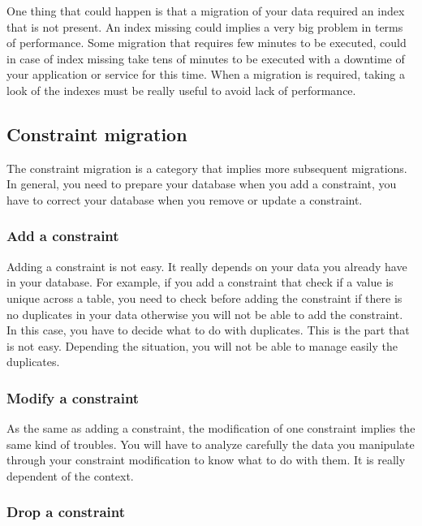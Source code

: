 One thing that could happen is that a migration of your data required an index that is not present. An index missing could implies a very big problem in terms of performance. Some migration that requires few minutes to be executed, could in case of index missing take tens of minutes to be executed with a downtime of your application or service for this time. When a migration is required, taking a look of the indexes must be really useful to avoid lack of performance.

\subsection{Constraint migration}

The constraint migration is a category that implies more subsequent migrations. In general, you need to prepare your database when you add a constraint, you have to correct your database when you remove or update a constraint.

\subsubsection{Add a constraint\\}

Adding a constraint is not easy. It really depends on your data you already have in your database. For example, if you add a constraint that check if a value is unique across a table, you need to check before adding the constraint if there is no duplicates in your data otherwise you will not be able to add the constraint. In this case, you have to decide what to do with duplicates. This is the part that is not easy. Depending the situation, you will not be able to manage easily the duplicates.

\subsubsection{Modify a constraint\\}

As the same as adding a constraint, the modification of one constraint implies the same kind of troubles. You will have to analyze carefully the data you manipulate through your constraint modification to know what to do with them. It is really dependent of the context.

\subsubsection{Drop a constraint\\}

